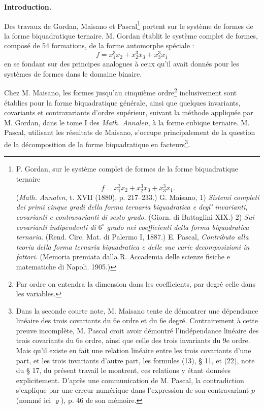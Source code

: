 \documentclass[11pt]{article}
\begin{document}
\vspace{3em}

\begin{center}
\textbf{Introduction.}
\end{center}

Des travaux de Gordan, Maisano et Pascal\footnote{P. Gordan, sur le système complet de formes de la forme biquadratique ternaire
\[
f=x_1^3x_2+x_2^3x_3+x_3^3x_1.
\]
(\emph{Math. Annalen}, t. XVII (1880), p. 217--233.)
G. Maisano, 1) \emph{Sistemi completi dei primi cinque gradi della forma ternaria biquadratica e degl' invarianti, covarianti e contravarianti di sesto grado}. (Giorn. di Battaglini XIX.)
2) \emph{Sui covarianti indipendenti di $6^\circ$ grado nei coefficienti della forma biquadratica ternaria}. (Rend. Circ. Mat. di Palermo I, 1887.)
E. Pascal, \emph{Contributo alla teoria della forma ternaria biquadratica e delle sue varie decomposizioni in fattori}. (Memoria premiata dalla R. Accademia delle scienze fisiche e matematiche di Napoli. 1905.)} portent sur le système de formes de la forme biquadratique ternaire. M. Gordan établit le système complet de formes, composé de 54 formations, de la forme automorphe spéciale :
\[
f=x_1^3x_2+x_2^3x_3+x_3^3x_1
\]
en se fondant sur des principes analogues à ceux qu'il avait donnés pour les systèmes de formes dans le domaine binaire.

Chez M. Maisano, les formes jusqu'au cinquième ordre\footnote{Par \og{} ordre \fg{} on entendra la dimension dans les coefficients, par \og{} degré \fg{} celle dans les variables.} inclusivement sont établies pour la forme biquadratique générale, ainsi que quelques invariants, covariants et contravariants d'ordre supérieur, suivant la méthode appliquée par M. Gordan, dans le tome I des \emph{Math. Annalen}, à la forme cubique ternaire. M. Pascal, utilisant les résultats de Maisano, s'occupe principalement de la question de la décomposition de la forme biquadratique en facteurs\footnote{Dans la seconde courte note, M. Maisano tente de démontrer une dépendance linéaire des trois covariants du 6e ordre et du 6e degré. Contrairement à cette preuve incomplète, M. Pascal croit avoir démontré l'indépendance linéaire des trois covariants du 6e ordre, ainsi que celle des trois invariants du 9e ordre. Mais qu'il existe en fait une relation linéaire entre les trois covariants d'une part, et les trois invariants d'autre part, les formules (13), \S{} 11, et (22), note du \S{} 17, du présent travail le montrent, ces relations y étant données explicitement. D'après une communication de M. Pascal, la contradiction s'explique par une erreur numérique dans l'expression de son contravariant $p$ (nommé ici $\varrho$), p. 46 de son mémoire.}.
\end{document}
